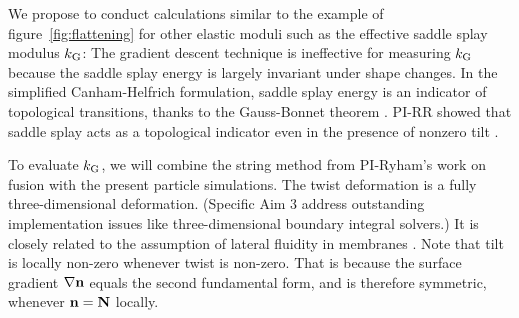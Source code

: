 We propose to conduct calculations similar to the example of figure~\ref{fig:flattening} for other elastic moduli such as the effective saddle splay modulus $k_{\mathrm{G}}$:
%
The gradient descent technique is ineffective for measuring $k_{\mathrm{G}}$ because
the saddle splay energy is largely invariant under shape changes.
In the simplified Canham-Helfrich formulation, saddle splay energy is an indicator of topological transitions, thanks to the  Gauss-Bonnet theorem
\cite{TerziDeserno17}.
PI-RR showed that saddle splay acts as a topological indicator even in the presence of nonzero tilt \cite{RyKlYaCo16}. 

To evaluate $k_{\mathrm{G}}$, we will combine the string method from PI-Ryham's work on fusion \cite{RyKlYaCo16} with
the present particle simulations. 
%
%
The twist deformation is a fully three-dimensional deformation. 
(Specific Aim 3 address outstanding implementation issues like three-dimensional boundary integral solvers.) 
It is closely related to the assumption of lateral fluidity in membranes \cite{Hamm2000}. Note that tilt is locally non-zero whenever twist is non-zero.
That is because the surface gradient $\nabla {\bf n}$ equals the second fundamental form, and is therefore symmetric, whenever ${\bf n} = {\bf N}$ locally. 

